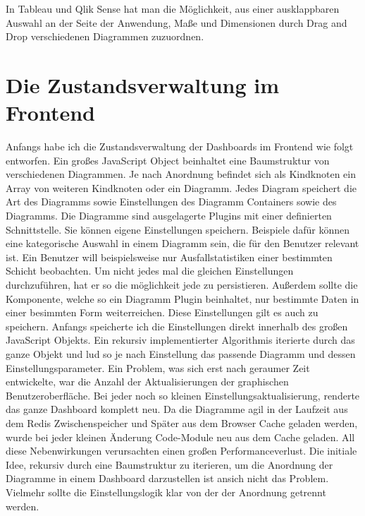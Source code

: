 


In Tableau und Qlik Sense hat man die Möglichkeit, aus einer ausklappbaren Auswahl an der Seite der
Anwendung, Maße und Dimensionen durch Drag and Drop verschiedenen Diagrammen zuzuordnen. 

\section{Die Zustandsverwaltung im Frontend}
Anfangs habe ich die Zustandsverwaltung der Dashboards im Frontend wie
folgt entworfen. Ein großes JavaScript Object beinhaltet eine Baumstruktur
von verschiedenen Diagrammen. Je nach Anordnung befindet sich als Kindknoten
ein Array von weiteren Kindknoten oder ein Diagramm. Jedes Diagram speichert
die Art des Diagramms sowie Einstellungen des Diagramm Containers sowie des
Diagramms. Die Diagramme sind ausgelagerte Plugins mit einer definierten
Schnittstelle. Sie können eigene Einstellungen speichern. Beispiele dafür
können eine kategorische Auswahl in einem Diagramm sein, die für den Benutzer
relevant ist. Ein Benutzer will beispielsweise nur Ausfallstatistiken einer
bestimmten Schicht beobachten. Um nicht jedes mal die gleichen Einstellungen
durchzuführen, hat er so die möglichkeit jede zu persistieren. Außerdem sollte
die Komponente, welche so ein Diagramm Plugin beinhaltet, nur bestimmte Daten
in einer besimmten Form weiterreichen. Diese Einstellungen gilt es auch zu speichern.
Anfangs speicherte ich die Einstellungen direkt innerhalb des großen JavaScript Objekts.
Ein rekursiv implementierter Algorithmis iterierte durch das ganze Objekt und lud so 
je nach Einstellung das passende Diagramm und dessen Einstellungsparameter. Ein Problem,
was sich erst nach geraumer Zeit entwickelte, war die Anzahl der Aktualisierungen
der graphischen Benutzeroberfläche. Bei jeder noch so kleinen Einstellungsaktualisierung,
renderte das ganze Dashboard komplett neu. Da die Diagramme agil in der Laufzeit aus dem
Redis Zwischenspeicher und Später aus dem Browser Cache geladen werden, wurde bei jeder
kleinen Änderung Code-Module neu aus dem Cache geladen. All diese Nebenwirkungen
verursachten einen großen Performanceverlust. Die initiale Idee, rekursiv durch
eine Baumstruktur zu iterieren, um die Anordnung der Diagramme in einem Dashboard
darzustellen ist ansich nicht das Problem. Vielmehr sollte die Einstellungslogik klar
von der der Anordnung getrennt werden.  

